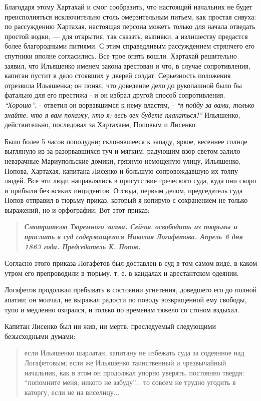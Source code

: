 \documentclass[a4paper,20pt]{article}
\begin{document}
Благодаря этому Хартахай и смог сообразить, что настоящий начальник не будет
преисполняться исключительно столь омерзительным питьем, как простая сивуха: по
рассуждению Хартахая, настоящая персона можеть только для начала отведать
простой водки, — для открытия, так сказать, выпивки, а излишеству предастся
более благородными питиями. С этим справедливым рассуждением стряпчего его
спутники вполне согласились. Все трое опять вошли. Хартахай решительно заявил,
что Ильяшенко именем закона арестован и что, в случае сопротивления, капитан
пустит в дело стоявших у дверей солдат.  Серьезность положения отрезвила
Ильяшенка; он понял, что доведение дело до рукопашной было бы фатально для его
престижа - и он избрал другой способ сопротивления. \emph{``Хорошо''}, -
ответил он ворвавшимся к нему властям, - \emph{``я пойду за вами, только
знайте. что я вам покажу, кто я; весь век будете плакаться!''} Ильяшенко,
действительно, последовал за Хартахаем, Поповым и Лисенко.

Было более 5 часов пополудни; склонявшееся к западу, яркое, 
весеннее солнце выглянуло из за разорвавшихся туч и мягким, радующим взор светом залило
невзрачные Мариупольские домики, грязную немощеную улицу,
Ильяшенко, Попова, Хартахая, капитана Лисенко и большую
сопровождавшую их толпу людей. Все эти люди направлялись в присутствие греческого суда, 
куда они скоро и прибыли без всяких инцидентов. Отсюда, первым делом, председатель суда Попов
отправил в тюрьму приказ, который я копирую с сохранением не только выражений, но и орфографии. Вот этот приказ:

\begin{quote}
\em\bfseries
Смотрителю Тюремного замка. Сейчас освободить из тюрьмы и 
прислать в суд содержащегося Николая Логафетова. Апрель
6 дня 1863 года. Председатель К. Попов.
\end{quote}

Согласно этого приказа Логафетов был доставлен в суд в том самом виде, в каком
утром его препроводили в тюрьму, т. е. в кандалах и арестантском одеянии.

Логафетов продолжал пребывать в состоянии угнетения, доведшего его до полной
апатии; он молчал, не выражал радости по поводу возвращенной ему свободы, тупо
и медленно озирался, и только по временам тяжело со стоном вздыхал.

Капитан Лисенко был ни жив, ни мертв, преследуемый следующими безысходными думами:

\begin{quote}
\em\bfseries
	
если Ильяшенко шарлатан, капитану не избежать суда за содеянное над
Логафетовым; если же Ильяшенко таинственный и чрезвычайный начальник,
как в этом он продолжал упорно уверять, постоянно твердя: ``попомните
меня, никото не забуду''... то совсем не трудно угодить в каторгу, если
не на виселицу...

\end{quote}
\end{document}
